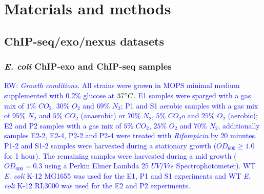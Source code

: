 \documentclass{bmcart}
\newcommand{\RW}[1]{\textcolor{blue}{RW: #1}}
\newcommand{\sig}{\sigma^{70}}
\begin{document}
\section*{Materials and methods}
\label{sec:methods}

\subsection*{ChIP-seq/exo/nexus datasets}

\subsubsection*{\textit{E. coli} ChIP-exo and ChIP-seq samples}

\RW{
\textit{Growth conditions.} All strains were grown in MOPS minimal
medium supplemented with $0.2\%$ glucose \cite{neidhardt74} at
$37\degree C$. E1 samples were sparged with a gas mix of $1\%$ $CO_2$,
$30\%$ $O_2$ and $69\%$ $N_2$; P1 and S1 aerobic samples with a gas
mix of $95\%$ $N_2$ and $5\%$ $CO_2$ (anaerobic) or $70\%$ $N_2$,
$5\%$ $CO_2$o and $25\%$ $O_2$ (aerobic); E2 and P2 samples with a gas
mix of $5\%$ $CO_2$, $25\%$ $O_2$ and $70\%$ $N_2$, additionally
samples E2-2, E2-4, P2-2 and P2-4 were treated with
\textit{Rifampicin} by 20 minutes. P1-2 and S1-2 samples were
harvested during a stationary growth ($OD_{600} \geq 1.0$ for 1
hour). The remaining samples were harvested during a mid growth
($OD_{600} = 0.3$ using a Perkin Elmer Lambda 25 $UV/Vis$
Spectrophotometer). WT \textit{E. coli} K-12 MG1655 was used for the
E1, P1 and S1 experiments and WT \textit{E. coli} K-12 RL3000 was used
for the E2 and P2 experiments.}
\end{document}
